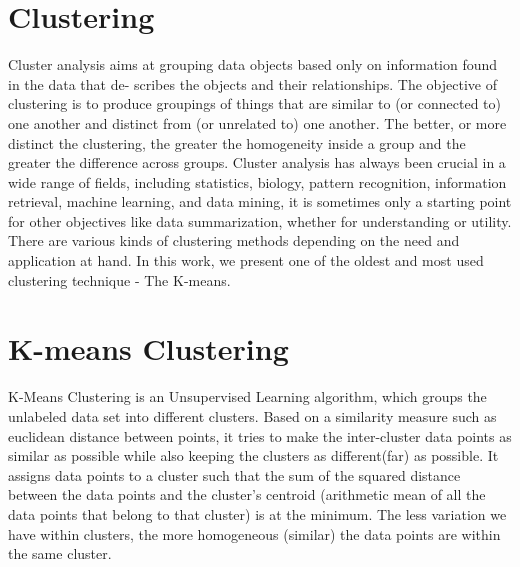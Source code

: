\documentclass[fleqn]{report}
\begin{document}
	\section{Clustering}
	Cluster analysis aims at grouping data objects based only on information found in the data that de-
	scribes the objects and their relationships. The objective of clustering is to produce groupings of things that are similar to (or connected to) one another and distinct from (or unrelated to) one another. The better, or more distinct the clustering, the greater the homogeneity  inside a group and the greater the difference across groups. Cluster analysis has always been crucial in a wide range of fields, including statistics, biology, pattern recognition, information retrieval, machine learning, and data mining, it is sometimes only a starting point for other objectives like data summarization, whether for understanding or utility.\\
	There are various kinds of clustering methods depending on the need and application at hand. In this
	work, we present one of the oldest and most used clustering technique - The K-means. 
	
	\section{K-means Clustering}
	K-Means Clustering is an Unsupervised Learning algorithm, which groups the unlabeled data set into
	different clusters. Based on a similarity measure such as euclidean distance between points, it tries to
	make the inter-cluster data points as similar as possible while also keeping the clusters as different(far)
	as possible. It assigns data points to a cluster such that the sum of the squared distance between the
	data points and the cluster’s centroid (arithmetic mean of all the data points that belong to that cluster)
	is at the minimum. The less variation we have within clusters, the more homogeneous (similar) the data
	points are within the same cluster.
	
\end{document}
